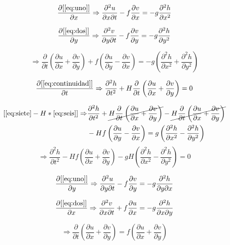\documentclass{article}
\newcommand\pder[2]{\ensuremath {\dfrac{\partial#1}{\partial#2}}}
\newcommand{\ppder}[2]{ \ensuremath {\dfrac{\partial^2 #1}{\partial #2^2}}}
\newcommand{\ppcder}[3]{ \ensuremath {\dfrac{\partial^2 #1}{\partial #2\partial #3}}}
\begin{document}
\begin{equation}
	\pder{[\eqref{eq:uno}]}{x} \Rightarrow
	\ppcder{u}{x}{t} - f\pder{v}{x} = -g \ppder{h}{x}
	\label{eq:cuatro}
\end{equation}

\begin{equation}
	\pder{[\eqref{eq:dos}]}{y} \Rightarrow
	\ppcder{v}{y}{t} - f\pder{v}{y} = -g \ppder{h}{y}
	\label{eq:cinco}
\end{equation}

\begin{equation}
	[\eqref{eq:cuatro}+\eqref{eq:cinco}] \Rightarrow
	\pder{}{t}\left(\pder{u}{x}+\pder{v}{y}\right) + f\left(\pder{u}{y}-\pder{v}{x}\right) = -g \left(\ppder{h}{x}+\ppder{h}{y}\right)
	\label{eq:seis}
\end{equation}

\begin{equation}
	\pder{[\eqref{eq:continuidad}]}{t} \Rightarrow
	\ppder{h}{t} + H\pder{}{t}\left(\pder{u}{x}+\pder{v}{y}\right) = 0
	\label{eq:siete}
\end{equation}

\newcommand{\uymvx}{\left(\pder{u}{x}+\pder{v}{y}\right)}
\newcommand{\uxpvy}{\left(\pder{u}{x}+\pder{v}{y}\right)}
\newcommand{\hxphy}{\left(\ppder{h}{x}-\ppder{h}{y}\right)}
\begin{equation}
    \begin{split}
	[\eqref{eq:siete}-H*\eqref{eq:seis}] \Rightarrow &
	\ppder{h}{t} + \cancel{H\pder{}{t}\uxpvy} -
	\cancel{H\pder{}{t}\uxpvy} \\
	& - Hf\left(\pder{u}{y}-\pder{v}{x}\right) = g \hxphy
    \end{split}
    \nonumber
\end{equation}
\begin{equation}
    \Rightarrow \ppder{h}{t} - Hf\uymvx
	 -gH \hxphy = 0
    \label{eq:ocho}
\end{equation}

\begin{equation}
	\pder{[\eqref{eq:uno}]}{y} \Rightarrow
	\ppcder{u}{y}{t} - f\pder{v}{y} = -g \ppcder{h}{y}{x}
	\label{eq:nueve}
\end{equation}

\begin{equation}
	\pder{[\eqref{eq:dos}]}{x} \Rightarrow
	\ppcder{v}{x}{t} + f\pder{u}{x} = -g \ppcder{h}{x}{y}
	\label{eq:diez}
\end{equation}

\begin{equation}
	[\eqref{eq:nueve}+\eqref{eq:diez}] \Rightarrow
	\pder{}{t} \uymvx = f \uxpvy
	\label{eq:once}
\end{equation}
\end{document}
